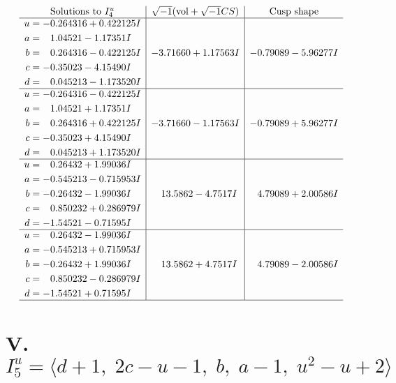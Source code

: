 \documentclass[1p]{elsarticle_modified}
\theoremstyle{definition}
\newcommand{\I}{\sqrt{-1}}
\begin{document}
$$\begin{array}{c|c|c}  
\text{Solutions to }I^u_{4}& \I (\text{vol} + \sqrt{-1}CS) & \text{Cusp shape}\\
 \hline 
\begin{aligned}
u &= -0.264316 + 0.422125 I \\
a &= \phantom{-}1.04521 - 1.17351 I \\
b &= \phantom{-}0.264316 - 0.422125 I \\
c &= -0.35023 - 4.15490 I \\
d &= \phantom{-}0.045213 - 1.173520 I\end{aligned}
 & -3.71660 + 1.17563 I & -0.79089 - 5.96277 I \\ \hline\begin{aligned}
u &= -0.264316 - 0.422125 I \\
a &= \phantom{-}1.04521 + 1.17351 I \\
b &= \phantom{-}0.264316 + 0.422125 I \\
c &= -0.35023 + 4.15490 I \\
d &= \phantom{-}0.045213 + 1.173520 I\end{aligned}
 & -3.71660 - 1.17563 I & -0.79089 + 5.96277 I \\ \hline\begin{aligned}
u &= \phantom{-}0.26432 + 1.99036 I \\
a &= -0.545213 - 0.715953 I \\
b &= -0.26432 - 1.99036 I \\
c &= \phantom{-}0.850232 + 0.286979 I \\
d &= -1.54521 - 0.71595 I\end{aligned}
 & \phantom{-}13.5862 - 4.7517 I & \phantom{-}4.79089 + 2.00586 I \\ \hline\begin{aligned}
u &= \phantom{-}0.26432 - 1.99036 I \\
a &= -0.545213 + 0.715953 I \\
b &= -0.26432 + 1.99036 I \\
c &= \phantom{-}0.850232 - 0.286979 I \\
d &= -1.54521 + 0.71595 I\end{aligned}
 & \phantom{-}13.5862 + 4.7517 I & \phantom{-}4.79089 - 2.00586 I\\
 \hline 
 \end{array}$$\newpage\newpage\renewcommand{\arraystretch}{1}
\centering \section*{V. $I^u_{5}= \langle d+1,\;2 c- u-1,\;b,\;a-1,\;u^2- u+2 \rangle$}
\end{document}
